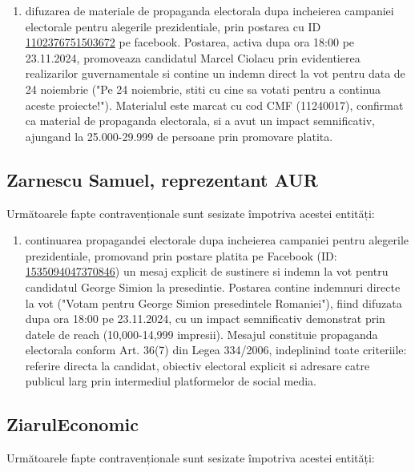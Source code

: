 \documentclass[a4paper,12pt]{article}
\begin{document}
\begin{enumerate}[leftmargin=*, label=\arabic*.)]
    \item difuzarea de materiale de propaganda electorala dupa incheierea campaniei electorale pentru alegerile prezidentiale, prin postarea cu ID \href{https://www.facebook.com/ads/library/?id=1102376751503672}{1102376751503672} pe facebook. Postarea, activa dupa ora 18:00 pe 23.11.2024, promoveaza candidatul Marcel Ciolacu prin evidentierea realizarilor guvernamentale si contine un indemn direct la vot pentru data de 24 noiembrie ("Pe 24 noiembrie, stiti cu cine sa votati pentru a continua aceste proiecte!"). Materialul este marcat cu cod CMF (11240017), confirmat ca material de propaganda electorala, si a avut un impact semnificativ, ajungand la 25.000-29.999 de persoane prin promovare platita.
\end{enumerate}

\vspace{0.5cm}

\subsection{Zarnescu Samuel, reprezentant AUR}
Următoarele fapte contravenționale sunt sesizate împotriva acestei entități:

\begin{enumerate}[leftmargin=*, label=\arabic*.)]
    \item continuarea propagandei electorale dupa incheierea campaniei pentru alegerile prezidentiale, promovand prin postare platita pe Facebook (ID: \href{https://www.facebook.com/ads/library/?id=1535094047370846}{1535094047370846}) un mesaj explicit de sustinere si indemn la vot pentru candidatul George Simion la presedintie. Postarea contine indemnuri directe la vot ("Votam pentru George Simion presedintele Romaniei"), fiind difuzata dupa ora 18:00 pe 23.11.2024, cu un impact semnificativ demonstrat prin datele de reach (10,000-14,999 impresii). Mesajul constituie propaganda electorala conform Art. 36(7) din Legea 334/2006, indeplinind toate criteriile: referire directa la candidat, obiectiv electoral explicit si adresare catre publicul larg prin intermediul platformelor de social media.
\end{enumerate}

\vspace{0.5cm}

\subsection{ZiarulEconomic}
Următoarele fapte contravenționale sunt sesizate împotriva acestei entități:
\end{document}
